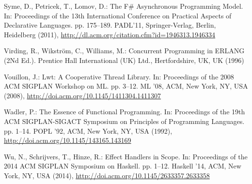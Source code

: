 \documentclass{llncs}
\begin{document}
\begin{thebibliography}{36}
Syme, D., Petricek, T., Lomov, D.: {The F\# Asynchronous Programming Model}.
\newblock In: Proceedings of the 13th International Conference on Practical
  Aspects of Declarative Languages. pp. 175--189. PADL'11, Springer-Verlag,
  Berlin, Heidelberg (2011),
  \urlprefix\url{http://dl.acm.org/citation.cfm?id=1946313.1946334}

Virding, R., Wikstr\"{o}m, C., Williams, M.: {Concurrent Programming in ERLANG
  (2Nd Ed.)}.
\newblock Prentice Hall International (UK) Ltd., Hertfordshire, UK, UK (1996)

Vouillon, J.: {Lwt: A Cooperative Thread Library}.
\newblock In: Proceedings of the 2008 ACM SIGPLAN Workshop on ML. pp. 3--12. ML
  '08, ACM, New York, NY, USA (2008),
  \urlprefix\url{http://doi.acm.org/10.1145/1411304.1411307}

Wadler, P.: {The Essence of Functional Programming}.
\newblock In: Proceedings of the 19th ACM SIGPLAN-SIGACT Symposium on
  Principles of Programming Languages. pp. 1--14. POPL '92, ACM, New York, NY,
  USA (1992), \urlprefix\url{http://doi.acm.org/10.1145/143165.143169}

Wu, N., Schrijvers, T., Hinze, R.: {Effect Handlers in Scope}.
\newblock In: Proceedings of the 2014 ACM SIGPLAN Symposium on Haskell. pp.
  1--12. Haskell '14, ACM, New York, NY, USA (2014),
  \urlprefix\url{http://doi.acm.org/10.1145/2633357.2633358}

\end{thebibliography}
\end{document}
